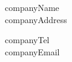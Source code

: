 \documentclass{article}   %
\begin{document}
\vfill %
\setlength{\columnsep}{1.5cm}
\begin{multicols}{2}
\noindent %
\begin{minipage}[t]{1\linewidth} %
    \raggedright                 %
    {{companyName}}\\            %
    {{companyAddress}}\\         %
\end{minipage}
\begin{minipage}[t]{1\linewidth} %
    \raggedright
     {{companyTel}}\\     %
     {{companyEmail}}\\ %
\end{minipage}
\end{multicols}
\end{document}
